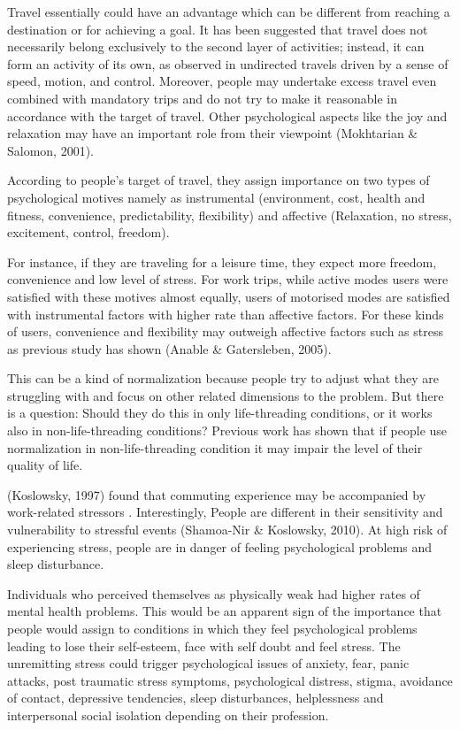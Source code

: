 \documentclass[
11pt, %
oneside, %
english, %
singlespacing, %
]{macthesis} %
\begin{document}
Travel essentially could have an advantage which can be different from reaching a destination or for achieving a goal. It has been suggested that travel does not necessarily belong exclusively to the second layer of activities; instead, it can form an activity of its own, as observed in undirected travels driven by a sense of speed, motion, and control. Moreover, people may undertake excess travel even combined with mandatory trips and do not try to make it reasonable in accordance with the target of travel. Other psychological aspects like the joy and relaxation may have an important role from their viewpoint (Mokhtarian \& Salomon, 2001).

According to people's target of travel, they assign importance on two types of psychological motives namely as instrumental (environment, cost, health and fitness, convenience, predictability, flexibility) and affective (Relaxation, no stress, excitement, control, freedom).

For instance, if they are traveling for a leisure time, they expect more freedom, convenience and low level of stress. For work trips, while active modes users were satisfied with these motives almost equally, users of motorised modes are satisfied with instrumental factors with higher rate than affective factors. For these kinds of users, convenience and flexibility may outweigh affective factors such as stress as previous study has shown (Anable \& Gatersleben, 2005).

This can be a kind of normalization because people try to adjust what they are struggling with and focus on other related dimensions to the problem. But there is a question: Should they do this in only life-threading conditions, or it works also in non-life-threading conditions? Previous work has shown that if people use normalization in non-life-threading condition it may impair the level of their quality of life.

(Koslowsky, 1997) found that commuting experience may be accompanied by work-related stressors . Interestingly, People are different in their sensitivity and vulnerability to stressful events (Shamoa-Nir \& Koslowsky, 2010). At high risk of experiencing stress, people are in danger of feeling psychological problems and sleep disturbance.

Individuals who perceived themselves as physically weak had higher rates of mental health problems. This would be an apparent sign of the importance that people would assign to conditions in which they feel psychological problems leading to lose their self-esteem, face with self doubt and feel stress. The unremitting stress could trigger psychological issues of anxiety, fear, panic attacks, post traumatic stress symptoms, psychological distress, stigma, avoidance of contact, depressive tendencies, sleep disturbances, helplessness and interpersonal social isolation depending on their profession.
\end{document}
